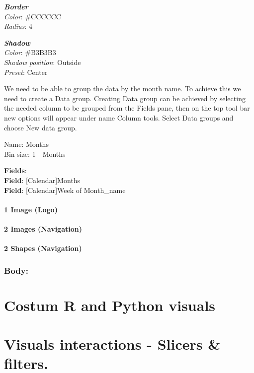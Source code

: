 \documentclass[
]{book}
\begin{document}
\textbf{\emph{Border}}\\
\emph{Color}: \#CCCCCC\\
\emph{Radius}: 4

\textbf{\emph{Shadow}}\\
\emph{Color}: \#B3B3B3\\
\emph{Shadow position}: Outside\\
\emph{Preset}: Center

We need to be able to group the data by the month name.
To achieve this we need to create a Data group.
Creating Data group can be achieved by selecting the needed column to be grouped from the Fields pane, then on the top tool bar new options will appear under name Column tools. Select Data groups and choose New data group.

Name: Months\\
Bin size: 1 - Months

\textbf{Fields}:\\
\textbf{Field}: {[}Calendar{]}Months\\
\textbf{Field}: {[}Calendar{]}Week of Month\_name

\hypertarget{image-logo}{%
\subsubsection{1 Image (Logo)}\label{image-logo}}

\hypertarget{images-navigation}{%
\subsubsection{2 Images (Navigation)}\label{images-navigation}}

\hypertarget{shapes-navigation}{%
\subsubsection{2 Shapes (Navigation)}\label{shapes-navigation}}

\hypertarget{body}{%
\subsection{Body:}\label{body}}

\hypertarget{costum-r-and-python-visuals}{%
\chapter{Costum R and Python visuals}\label{costum-r-and-python-visuals}}

\hypertarget{visuals-interactions---slicers-filters.}{%
\chapter{Visuals interactions - Slicers \& filters.}\label{visuals-interactions---slicers-filters.}}

  
\end{document}
